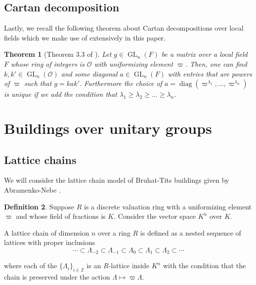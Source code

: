 \documentclass{eptcs}
\newtheorem{theorem}{Theorem}[section]
\theoremstyle{remark}
\theoremstyle{definition}
\newtheorem{definition}[theorem]{Definition}
\DeclareMathOperator{\GL}{GL}
\DeclareMathOperator{\diag}{diag}
\begin{document}
\subsection{Cartan decomposition}

Lastly, we recall the following theorem about Cartan decompositions over local fields which we make use of extensively in this paper.
\begin{theorem}[Theorem 3.3 of \cite{prasad2001representation}]
    \label{th:cartan}
Let $g \in \GL_{n}(F)$ be a matrix over a local field $F$ whose ring of integers is $\mathcal{O}$ with uniformizing element $\varpi$. 
Then, one can find $k,k' \in \GL_{n}(\mathcal{O})$ and some diagonal $a \in \GL_{n}(F)$ with entries that are powers of $\varpi$ such that 
$    g= k a k'.$
Furthermore the choice of $a = \diag( \varpi^{ \lambda_{1}}, \dots ,\varpi^{\lambda_{n}})$ is unique if we add the condition
that $\lambda_{1} \geq \lambda_{2} \geq \dots \geq \lambda_{n}$. 
\end{theorem}
\section{Buildings over unitary groups}

\subsection{Lattice chains}

We will consider the lattice chain model of Bruhat-Tits buildings given by Abramenko-Nebe \cite{abramenko2002lattice}. 
\begin{definition}
    \label{de:lattice_chain}
Suppose $R$ is a discrete valuation ring with a uniformizing element $\varpi$ and 
whose field of fractions is $K$. Consider the vector space $K^{n}$ over $K$.

A lattice chain of dimension $n$ over a ring $R$ is defined
	as a nested sequence of lattices with proper inclusions
\begin{equation}
    \cdots \subset \Lambda_{-2} \subset \Lambda_{-1} \subset \Lambda_{0} \subset \Lambda_{1} \subset \Lambda_{2} \subset \cdots
\end{equation}

	where each of the $\{ \Lambda_{i} \}_{i \in \mathbb{Z}}$ is an $R$-lattice inside $K^{n}$ 
	with the condition that the chain is preserved under the action $\Lambda \mapsto \varpi \Lambda$.
\end{definition}
\end{document}
